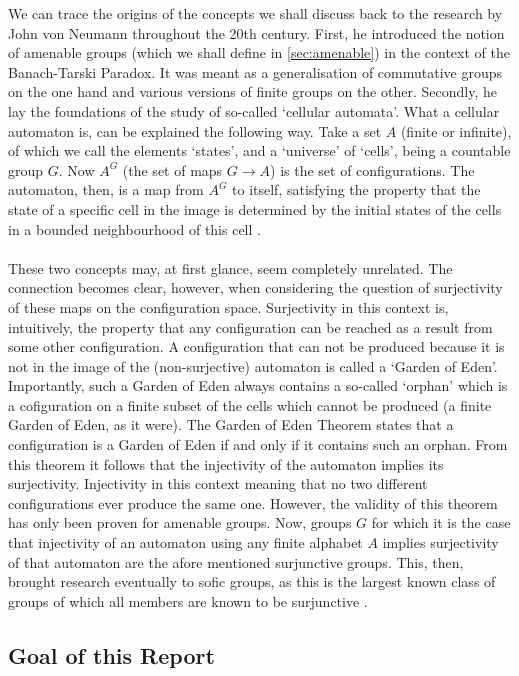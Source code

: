 \documentclass[titlepage, a4paper]{article}
\theoremstyle{theoremdd}
\theoremstyle{definitiondd}
\theoremstyle{remarkdd}
\begin{document}
We can trace the origins of the concepts we shall discuss back to the research by John von Neumann throughout the 20th century. First, he introduced the notion of amenable groups (which we shall define in \cref{sec:amenable}) in the context of the Banach-Tarski Paradox. It was meant as a generalisation of commutative groups on the one hand and various versions of finite groups on the other. Secondly, he lay the foundations of the study of so-called ‘cellular automata’. What a cellular automaton is, can be explained the following way. Take a set $A$ (finite or infinite), of which we call the elements ‘states’, and a ‘universe’ of ‘cells’, being a countable group $G$. Now $A^G$ (the set of maps $G \to A$) is the set of configurations. The automaton, then, is a map from $A^G$ to itself, satisfying the property that the state of a specific cell in the image is determined by the initial states of the cells in a bounded neighbourhood of this cell \cite{vonNeumann_1966} .\\
\\
These two concepts may, at first glance, seem completely unrelated. The connection becomes clear, however, when considering the question of surjectivity of these maps on the configuration space. Surjectivity in this context is, intuitively, the property that any configuration can be reached as a result from some other configuration. A configuration that can not be produced because it is not in the image of the (non-surjective) automaton is called a ‘Garden of Eden’. Importantly, such a Garden of Eden always contains a so-called ‘orphan’ which is a cofiguration on a finite subset of the cells which cannot be produced (a finite Garden of Eden, as it were). The Garden of Eden Theorem \cite[preface]{capraro_lupini_2015}
states that a configuration is a Garden of Eden if and only if it contains such an orphan. From this theorem it follows that the injectivity of the automaton implies its surjectivity. Injectivity in this context meaning that no two different configurations ever produce the same one. However, the validity of this theorem has only been proven for amenable groups.
Now, groups $G$ for which it is the case that injectivity of an automaton using any finite alphabet $A$ implies surjectivity of that automaton are the afore mentioned surjunctive groups. This, then, brought research eventually to sofic groups, as this is the largest known class of groups of which all members are known to be surjunctive \cite{ceccherini-silberstein_coornaert_2010}.  

\subsection*{Goal of this Report}
\end{document}
